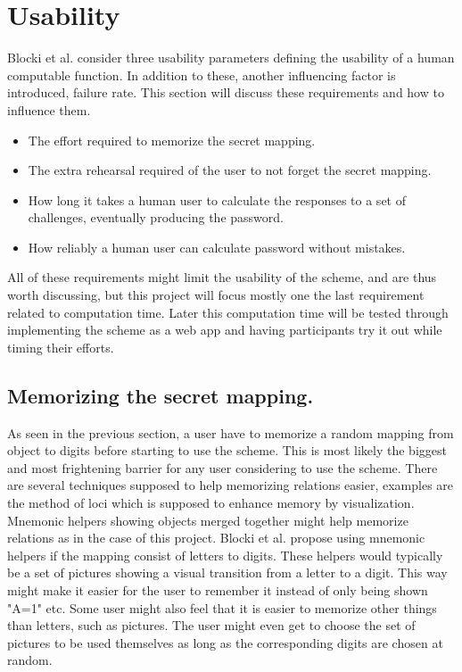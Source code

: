 \section{Usability}\label{sec:usability}
Blocki et al. \cite{hcp-blocki} consider three usability parameters defining the usability of a human computable function. In addition to these, another influencing factor is introduced, failure rate. This section will discuss these requirements and how to influence them.
\begin{itemize}
    \item The effort required to memorize the secret mapping.
    \item The extra rehearsal required of the user to not forget the secret mapping. 
    \item How long it takes a human user to calculate the responses to a set of challenges, eventually producing the password. 
    \item How reliably a human user can calculate password without mistakes.
\end{itemize}
All of these requirements might limit the usability of the scheme, and are thus worth discussing, but this project will focus mostly one the last requirement related to computation time. Later this computation time will be tested through implementing the scheme as a web app and having participants try it out while timing their efforts.

\subsection{Memorizing the secret mapping.}
As seen in the previous section, a user have to memorize a random mapping from object to digits before starting to use the scheme. This is most likely the biggest and most frightening barrier for any user considering to use the scheme. There are several techniques supposed to help memorizing relations easier, examples are the method of loci \cite{human-memory} which is supposed to enhance memory by visualization. Mnemonic helpers showing objects merged together might help memorize relations as in the case of this project. Blocki et al. \cite{hcp-blocki} propose using mnemonic helpers if the mapping consist of letters to digits. These helpers would typically be a set of pictures showing a visual transition from a letter to a digit. This way might make it easier for the user to remember it instead of only being shown "A=1" etc. Some user might also feel that it is easier to memorize other things than letters, such as pictures. The user might even get to choose the set of pictures to be used themselves as long as the corresponding digits are chosen at random. 


